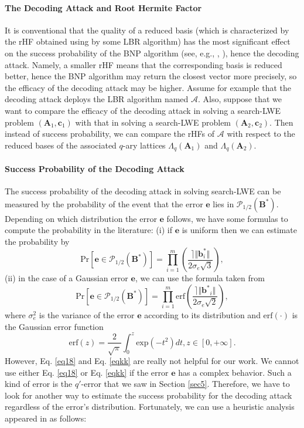 \documentclass{cta-author}
\begin{document}
\paragraph{The Decoding Attack and Root Hermite Factor} It is conventional that the quality of a reduced basis (which is characterized by the rHF obtained using by some LBR algorithm) has the most significant effect on the success probability of the BNP algorithm (see, e.g., \cite[Section 5.4]{APS15}, \cite{BBD+15, GvVW17}), hence the decoding attack. Namely, a smaller rHF means that the corresponding basis is reduced better, hence the BNP algorithm may return the closest vector more precisely, so the efficacy of the decoding attack may be higher.  Assume for example that the decoding attack deploys the LBR algorithm named $\mathcal{A}$.  Also, suppose that we want to compare the efficacy of the decoding attack in solving a search-LWE problem $(\mathbf{A}_1, \mathbf{c}_1)$ with that in solving a search-LWE problem  $(\mathbf{A}_2, \mathbf{c}_2)$. Then instead of success probability, we can compare the rHFs of $\mathcal{A}$ with respect to the reduced bases of the associated $q$-ary lattices $\Lambda_q{(\mathbf{A}_1)}$ and $\Lambda_q{(\mathbf{A}_2)}$.


\paragraph{Success Probability of  the Decoding Attack} 
The success probability of the decoding attack in solving search-LWE can be measured by the probability of the event that the error $\mathbf{e}$ lies in $\mathcal{P}_{1/2}(\mathbf{B^*})$.
Depending on which distribution the error $\mathbf{e}$ follows, we have some formulas to compute the probability in the literature: (i) if $\mathbf{e}$ is uniform then we can estimate the probability by
\begin{equation}\label{eq18}
\mathrm{Pr}\left[ \mathbf{e} \in \mathcal{P}_{1/2}(\mathbf{B^*})\right]= \prod_{i=1}^{m}\left(  \frac{ \rceil \Vert\mathbf{b}^{*}_i \Vert}{2\sigma_e\sqrt{3}} \right), 
\end{equation}
(ii) in the case of a Gaussian error $\mathbf{e}$, we can use the formula taken from \cite{LP11}
\begin{equation}\label{eqkk}
\mathrm{Pr}\left[ \mathbf{e} \in \mathcal{P}_{1/2}(\mathbf{B^*})\right]=\prod_{i=1}^{m}\mathrm{erf}\left( \frac{ \rceil \Vert \mathbf{b^{*}}_i \Vert}{2 \sigma_e \sqrt{2}} \right),
\end{equation} 
where $\sigma^2_e $ is the variance of the error $\mathbf{e}$ according to its distribution and $\mathrm{erf}(\cdot)$ is the Gaussian error function 
$$\mathrm{erf}(z)=\frac{2}{\sqrt{\pi}}\int_{0}^{z} \text{exp}(-t^2)dt, z \in [0, +\infty].$$
However, Eq. \eqref{eq18} and Eq. \eqref{eqkk} are really not helpful for our work. We cannot use either Eq. \eqref{eq18} or Eq. \eqref{eqkk} if the error $\mathbf{e}$ has a complex behavior. Such a kind of error is the $q'$-error that we saw in Section \ref{sec5}. Therefore, we have to look for another way to estimate the success probability for the  decoding attack regardless of the error's distribution. Fortunately, we can use a heuristic analysis appeared in \cite{KYGY16} as follows:
\end{document}
